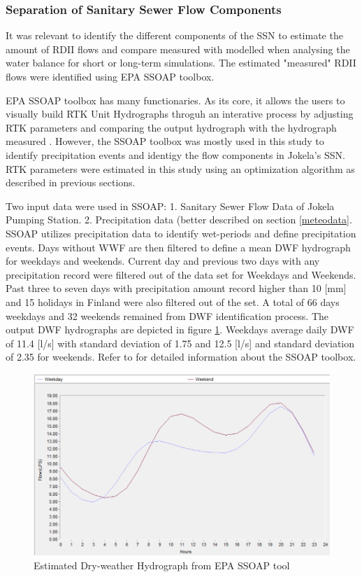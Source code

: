 \subsubsection{Separation of Sanitary Sewer Flow Components}

It was relevant to identify the different components of the \acf{SSN} to estimate the amount of RDII flows and compare measured with modelled when analysing the water balance for short or long-term simulations. The estimated "measured" RDII flows were identified using EPA SSOAP toolbox.

EPA SSOAP toolbox has many functionaries. As its core, it allows the users to visually build RTK Unit Hydrographs throguh an interative process by adjusting RTK parameters and comparing the output hydrograph with the hydrograph measured \cite{Vallabhaneni2007}. However, the SSOAP toolbox was mostly used in this study to identify precipitation events and identigy the flow components in Jokela's \ac{SSN}. RTK parameters were estimated in this study using an optimization algorithm as described in previous sections.

Two input data were used in SSOAP: 1. Sanitary Sewer Flow Data of Jokela Pumping Station. 2. Precipitation data (better described on section \ref{meteodata}. SSOAP utilizes precipitation data to identify wet-periods and define precipitation events. Days without \acf{WWF} are then filtered to define a mean \acf{DWF} hydrograph for weekdays and weekends. Current day and previous two days with any precipitation record were filtered out of the data set for Weekdays and Weekends. Past three to seven days with precipitation amount record higher than 10 [mm] and 15 holidays in Finland were also filtered out of the set. A total of 66 days weekdays and 32 weekends remained from DWF identification process. The output DWF hydrographs are depicted in figure \ref{fig:ssoapdryh}. Weekdays average daily DWF of 11.4 [l/s] with standard deviation of 1.75 and 12.5 [l/s] and standard deviation of 2.35 for weekends. 
Refer to \citet{Vallabhaneni2007} for detailed information about the SSOAP toolbox.

\begin{figure}[h]
    \centering
	\includegraphics[scale=0.6]{figures/ssoap_dry_hydrograph.png}
	\caption{Estimated Dry-weather Hydrograph from EPA SSOAP tool}
	\label{fig:ssoapdryh}
\end{figure}




